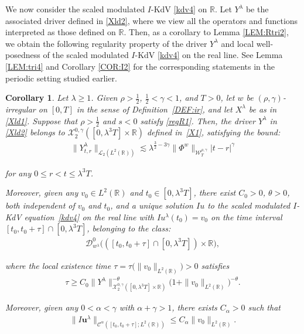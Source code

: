 \documentclass[letterpaper, 11pt,  reqno]{amsart}
\newtheorem{corollary}[theorem]{Corollary}
\newcommand{\1}{\hspace{0.5mm}\text{I}\hspace{0.5mm}}
\newcommand{\noi}{\noindent}
\newcommand{\R}{\mathbb{R}}
\newcommand{\CC}{\mathcal{C}}
\newcommand{\al}{\alpha}
\newcommand{\g}{\gamma}
\newcommand{\ld}{\lambda}
\newcommand{\ta}{\theta}
\newcommand{\les}{\lesssim}
\newcommand{\cL}{\mathcal{L}}
\newcommand{\cX}{\mathcal{X}}
\newcommand{\cD}{\mathscr{D}}
\newcommand{\W}{\mathcal{W}}
\newcommand{\uu}{\mathbf{u}}
\numberwithin{equation}{section}
\numberwithin{theorem}{section}
\begin{document}
We now consider the 
 scaled modulated $I$-KdV \eqref{kdv4}
 on $\R$.
Let $Y^\ld$ be the associated
driver
defined in \eqref{Xld2}, 
where we view all the operators and functions 
interpreted as those defined on $\R$.
Then, 
as a corollary to 
Lemma \ref{LEM:Rtri2}, we obtain the following 
regularity property
of the driver $Y^\ld$
and local well-posedness of 
the  scaled modulated $I$-KdV \eqref{kdv4}
on the real line.
See
 Lemma \ref{LEM:tri4}
and Corollary \ref{COR:I2}
for the corresponding statements
in the periodic setting
studied earlier.





\begin{corollary}
\label{COR:RI1}
Let $\ld \ge 1$.
Given $\rho > \frac 12$, $\frac 12 < \g < 1$, and $T> 0$, 
let  $w$ be $(\rho,\g)$-irregular on $[0, T]$ in the sense of Definition~\ref{DEF:ir}, 
and let $X^\ld$ be as in \eqref{Xld1}.
Suppose that $\rho >  \frac 12$ and $s <  0$
satisfy 
\eqref{regR1}.
Then, 
the driver $Y^\ld$  in \eqref{Xld2}
belongs to $  \cX^{0, \g}_2([0, \ld^3T] \times \R)$ defined in~\eqref{X1}, 
satisfying the bound\textup{:}
\begin{align}
 \| Y^{\ld}_{t,r}  \|_{\cL_2 ( L^2(\R)) }
 \les
 \ld^{ \frac32  -3\g} 
  \|\Phi^{w}\|_{\W_{T}^{\rho, \g}}
 |t-r|^{\g}
\label{RW1}
\end{align}


\noi
for any $0\leq r<t \leq \ld^3T$.


Moreover, given any 
$v_0 \in L^2(\R)$ and  $t_0 \in [0, \ld^3 T]$, 
there exist $C_0 > 0$, $\ta > 0$, both independent of $v_0$ and $t_0$, 
and a unique solution $Iu$
to 
the scaled modulated $I$-KdV equation~\eqref{kdv4} 
on the real line
with $I u^\ld (t_0)= v_0$
on the time interval $[t_0, t_0 + \tau]\cap [0, \ld^3 T]$,  
belonging to the class\textup{:}
\begin{align*}
 \cD_{w^\ld}^0\big( ([t_0, t_0 + \tau] \cap [0, \ld^3 T]) \times \R\big), 
\end{align*}


\noi
where the local existence time 
$\tau = \tau \big(\| v_0 \|_{L^2(\R)}\big)> 0$ satisfies
\begin{align*}
\tau  \ge C_0 \|Y^\ld\|_{\cX^{0,\g}_2([0, \ld^3 T]\times \R)}^{-\ta} \big( 1 + \| v_0 \|_{L^2(\R)}\big)^{-\ta}.
\end{align*}

\noi
Moreover, given any $0 < \al < \g$
with $\al + \g > 1$, 
there exists $C_\al > 0$ such that 
\begin{align*}
 \| I\uu^\ld \|_{\CC^\al ([t_0, t_0 + \tau];L^2(\R))}\le C_\al \|v_0\|_{L^2(\R)}.
\end{align*}





\end{corollary}
\end{document}
